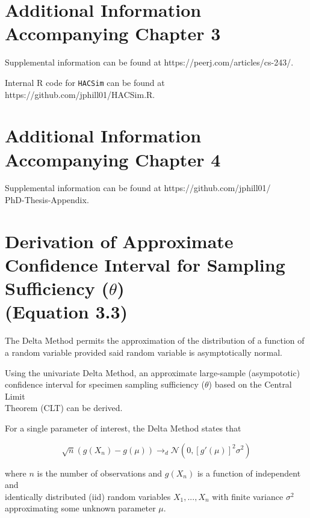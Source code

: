\linespread{1.0}


\appendix

\chapter{Additional Information Accompanying Chapter 3}

Supplemental information can be found at https://peerj.com/articles/cs-243/. 

Internal R code for {\tt HACSim} can be found at https://github.com/jphill01/HACSim.R.


\chapter{Additional Information Accompanying Chapter 4}

Supplemental information can be found at https://github.com/jphill01/\\PhD-Thesis-Appendix.

\chapter{Derivation of Approximate Confidence Interval for Sampling Sufficiency ($\theta$) \\ (Equation 3.3)}

The Delta Method permits the approximation of the distribution of a function of a random variable provided said random variable is asymptotically normal.

Using the univariate Delta Method, an approximate large-sample (asympototic) \\ confidence interval for specimen sampling sufficiency ($\theta$) based on the Central Limit \\ Theorem (CLT) can be derived.  

For a single parameter of interest, the Delta Method states that

\begin{equation}
\sqrt{n}(g(X_n) - g(\mu)) \rightarrow_d \mathcal{N}(0, [g'(\mu)]^2\sigma^2)
\end{equation}

\noindent where $n$ is the number of observations and $g(X_n)$ is a function of independent and \\ identically distributed (iid) random variables $X_1,...,X_n$ with finite variance $\sigma^2$ \\ approximating some unknown parameter $\mu$.

